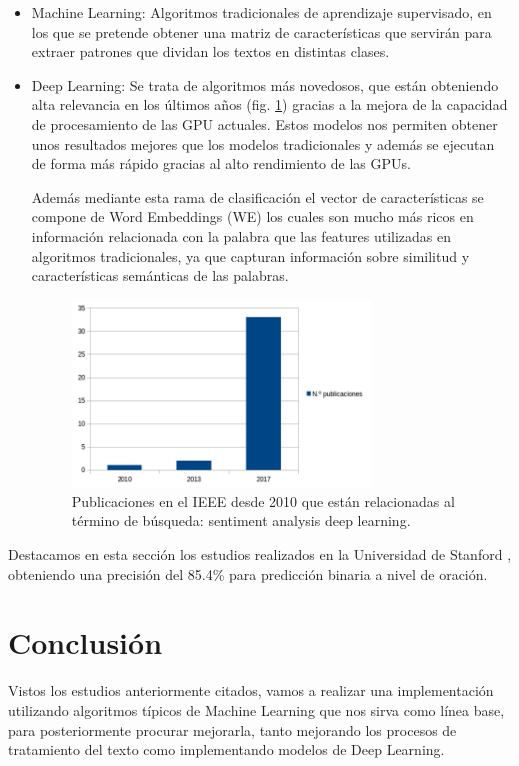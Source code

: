 \begin{itemize}
	\item Machine Learning: Algoritmos tradicionales de aprendizaje supervisado, en los que se pretende obtener una matriz de características que servirán para extraer patrones que dividan los textos en distintas clases.
	\item Deep Learning: Se trata de algoritmos más novedosos, que están obteniendo alta relevancia en los últimos años (fig. \ref{pdeep}) gracias a la mejora de la capacidad de procesamiento de las GPU actuales. Estos modelos nos permiten obtener unos resultados mejores que los modelos tradicionales y además se ejecutan de forma más rápido gracias al alto rendimiento de las GPUs. 
	
	Además mediante esta rama de clasificación el vector de características se compone de Word Embeddings (WE) los cuales son mucho más ricos en información relacionada con la palabra que las features utilizadas en algoritmos tradicionales, ya que capturan información sobre similitud y características semánticas de las palabras.
	
	\begin{figure}[!ht]
		\centering
		\includegraphics[width=0.75\textwidth]{imaxes/pubsDeep.png}
		\caption{Publicaciones en el IEEE desde 2010 que están relacionadas al término de búsqueda: sentiment analysis deep learning.}
				\label{pdeep}
	\end{figure}
\end{itemize}
Destacamos en esta sección los estudios realizados en la Universidad de Stanford \cite{Stanford}, obteniendo una precisión del 85.4\% para predicción binaria a nivel de oración.

\section {Conclusión}

Vistos los estudios anteriormente citados, vamos a realizar una implementación utilizando algoritmos típicos de Machine Learning que nos sirva como línea base, para posteriormente procurar mejorarla, tanto mejorando los procesos de tratamiento del texto como implementando modelos de Deep Learning.
